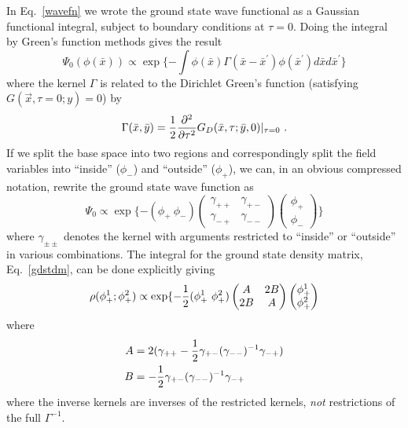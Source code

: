 \documentclass[12pt]{article}
\begin{document}
In Eq.~\ref{wavefn} we wrote the ground state wave functional as a Gaussian
functional integral, subject to boundary conditions at
$\tau=0$. Doing the integral by Green's function methods gives the result
\begin{equation}
\Psi_0 (\phi(\bar x)) \propto \exp\{-\int \phi(\bar x)
	\Gamma(\bar x-\bar x^\prime)\phi(\bar x^\prime)d\bar xd\bar x^\prime\}
\end{equation}
where the kernel $\Gamma$ is related to the Dirichlet Green's function
(satisfying $G(\vec x,\tau=0;y)=0$) by
\begin{equation}
\Gamma(\bar x,\bar y) = {1\over 2} {\partial^2 \over \partial \tau ^2}
	G_D(\bar x,\tau;\bar y,0)|_{\tau=0}~.
\label{kernel}
\end{equation}
If we split the base space into two regions and correspondingly split the
field variables into ``inside'' ($\phi_-$) and ``outside'' ($\phi_+$), we can,
in an obvious compressed notation, rewrite the ground state wave function as
\begin{equation}
\Psi_0 \propto \exp\{-(\phi_+~ \phi_-)
\begin{pmatrix}
\gamma_{++}&\gamma_{+-}\\\gamma_{-+}&\gamma_{--}
\end{pmatrix}
\begin{pmatrix}
\phi_+ \\ \phi_-
\end{pmatrix} \}
\end{equation}
where $\gamma_{\pm\pm}$ denotes the kernel with arguments restricted to
``inside'' or ``outside'' in various combinations. The integral for the
ground state density matrix, Eq.~\ref{gdstdm}, can be done explicitly giving
\begin{equation}
\rho(\phi^1_+; \phi^2_+) \propto
	\exp\{-{1\over 2}(\phi_+^1~ \phi_+^2) 
\begin{pmatrix}
A&2B\\ 2B&A
\end{pmatrix}
\begin{pmatrix}
\phi_+^1 \\ \phi_+^2
\end{pmatrix}
\label{gaussdm}
\end{equation}
where
\begin{align}
A &= 2(\gamma_{++} -{1 \over 2} \gamma_{+-} (\gamma_{--})^{-1} \gamma_{-+})\\
B &= -{1\over2} \gamma_{+-} (\gamma_{--})^{-1} \gamma_{-+}\\
\label{ABdm}
\end{align}
where the inverse kernels are inverses of the restricted kernels, {\it not}
restrictions of the full $\Gamma^{-1}$.
\end{document}
